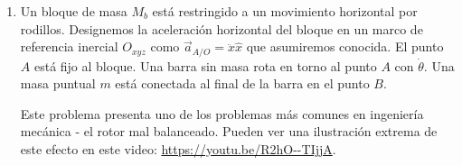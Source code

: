 \documentclass[11pt,spanish,a4paper]{article}
\begin{document}
\begin{enumerate}
\item
\begin{minipage}[t][9cm]{0.65\textwidth}
Un bloque de masa $M_b$ está restringido a un movimiento horizontal por rodillos.
Designemos la aceleración horizontal del bloque en un marco de referencia inercial $O_{xyz}$ como $\vec{a}_{A/O} = \ddot{x} \hat{x}$ que asumiremos conocida.
El punto $A$ está fijo al bloque.
Una barra sin masa rota en torno al punto $A$ con $\dot{\theta}$.
Una masa puntual $m$ está conectada al final de la barra en el punto $B$.

Este problema presenta uno de los problemas más comunes en ingeniería mecánica - el rotor mal balanceado.
Pueden ver una ilustración extrema de este efecto en este video: \url{https://youtu.be/R2hO--TIjjA}.


\end{minipage}
\end{enumerate}
\end{document}
